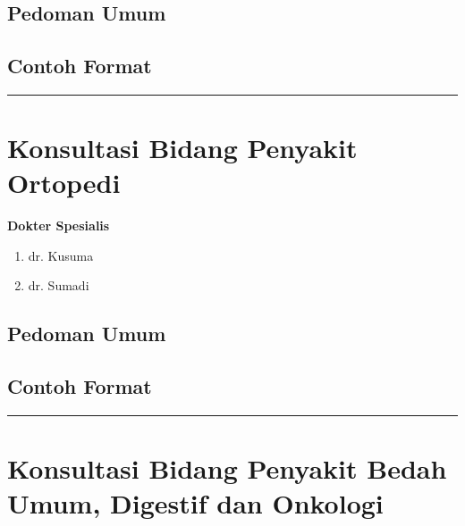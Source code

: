 \documentclass[
]{book}
\providecommand{\tightlist}{%
  \setlength{\itemsep}{0pt}\setlength{\parskip}{0pt}}
\begin{document}
\hypertarget{pedoman-umum-1}{%
\subsection{Pedoman Umum}\label{pedoman-umum-1}}

\hypertarget{contoh-format-1}{%
\subsection{Contoh Format}\label{contoh-format-1}}

\begin{center}\rule{0.5\linewidth}{0.5pt}\end{center}

\hypertarget{konsultasi-bidang-penyakit-ortopedi}{%
\section{Konsultasi Bidang Penyakit Ortopedi}\label{konsultasi-bidang-penyakit-ortopedi}}

\textbf{Dokter Spesialis}

\begin{enumerate}
\def\labelenumi{\arabic{enumi}.}
\tightlist
\item
  dr. Kusuma
\item
  dr. Sumadi
\end{enumerate}

\hypertarget{pedoman-umum-2}{%
\subsection{Pedoman Umum}\label{pedoman-umum-2}}

\hypertarget{contoh-format-2}{%
\subsection{Contoh Format}\label{contoh-format-2}}

\begin{center}\rule{0.5\linewidth}{0.5pt}\end{center}

\hypertarget{konsultasi-bidang-penyakit-bedah-umum-digestif-dan-onkologi}{%
\section{Konsultasi Bidang Penyakit Bedah Umum, Digestif dan Onkologi}\label{konsultasi-bidang-penyakit-bedah-umum-digestif-dan-onkologi}}
\end{document}
